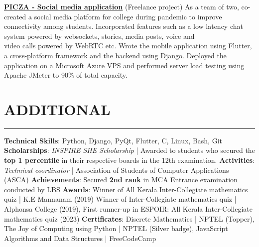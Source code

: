 \documentclass[letterpaper,MMMyyyy,nonstopmode]{simpleresumecv}
\begin{document}
        {\href{https://github.com/romaljose38/College-project}
        {\textbf{\large PICZA - Social media application}} 
        (Freelance project)
        } \hfill
        \BulletItem
            As a team of two, co-created a social media platform for college during pandemic to improve connectivity among students.
        \BulletItem
            Incorporated features such as a low latency chat system powered by websockets, stories, media posts, voice and \\ video calls powered by WebRTC etc.
        \BulletItem
            Wrote the mobile application using Flutter, a cross-platform framework and the backend using Django.
        \BulletItem
            Deployed the application on a Microsoft Azure VPS and performed server load testing using Apache JMeter\newline
            to 90\% of total capacity.

    \section*{ADDITIONAL}
    \hrule \vspace{8pt}
    \textbf{Technical Skills}: Python, Django, PyQt, Flutter, C, Linux, Bash, Git
    \newline
    \textbf{Scholarships}: \textit{INSPIRE SHE Scholarship} | Awarded to students who secured the \textbf{top 1 percentile} in their respective boards in the 12th examination.
    \newline
    \textbf{Activities}: \textit{Technical coordinator} | Association of Students of Computer Applications (ASCA)
    \newline
    \textbf{Achievements}: Secured \textbf{2nd rank} in MCA Entrance examination conducted by LBS
    \newline
    \textbf{Awards}: Winner of All Kerala Inter-Collegiate mathematics quiz | K.E Mannanam (2019) Winner of Inter-Collegiate mathematics quiz | Alphonsa College (2019), First runner-up in ESPOIR: All Kerala Inter-Collegiate mathematics quiz (2023)
    \newline
    \textbf{Certificates}: Discrete Mathematics | NPTEL (Topper), The Joy of Computing using Python | NPTEL (Silver badge), JavaScript Algorithms and Data Structures | FreeCodeCamp
\end{document}
